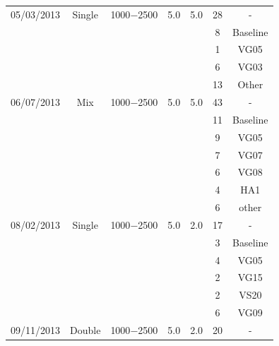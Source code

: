 \documentclass[osajnl,preprint,showpacs,superscriptaddress,12pt]{revtex4-1} %
\begin{document}
\begin{table}[h!]
\begin{center}
\begin{tabular}{c c c c c c c}
	05/03/2013 & Single & 1000$-$2500 & 5.0 & 5.0  &  28 &   -  \\
     	                   &            &                       &       &         &    8 &  Baseline\\	
     	                   &            &                       &       &         &    1 &  VG05\\
     	                   &            &                       &       &         &    6 &  VG03\\
     	                   &            &                       &       &         &    13 &  Other\\
    \hline
	06/07/2013 & Mix & 1000$-$2500 & 5.0 & 5.0  &  43 &   -  \\
	                   &            &                       &       &         &    11 &  Baseline\\	                   
	                   &            &                       &       &         &    9 &  VG05\\	                   
	                   &            &                       &       &         &    7 &  VG07\\
	                   &            &                       &       &         &    6 &  VG08\\
	                   &            &                       &       &         &    4 &  HA1\\
	                   &            &                       &       &         &    6 &  other\\
    \hline
	08/02/2013 & Single & 1000$-$2500 & 5.0 & 2.0  &  17 &   -  \\	
	                   &            &                       &       &         &    3 &  Baseline\\
	                   &            &                       &       &         &    4 &  VG05\\	                   
	                   &            &                       &       &         &    2 &  VG15\\
	                   &            &                       &       &         &    2 &  VS20\\
	                   &            &                       &       &         &    6 &  VG09\\
    \hline
    	09/11/2013 & Double & 1000$-$2500 & 5.0 & 2.0  &  20 &   -  \\	                   

\end{tabular}
\end{center}
\end{table}
\end{document}
